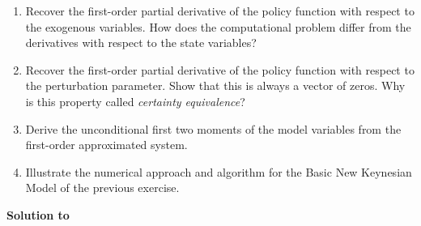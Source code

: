 \begin{enumerate}
	\item Recover the first-order partial derivative of the policy function with respect to the exogenous variables. How does the computational problem differ from the derivatives with respect to the state variables?
	\item Recover the first-order partial derivative of the policy function with respect to the perturbation parameter. Show that this is always a vector of zeros. Why is this property called \emph{certainty equivalence}?
	\item Derive the unconditional first two moments of the model variables from the first-order approximated system.
 	\item Illustrate the numerical approach and algorithm for the Basic New Keynesian Model of the previous exercise.
\end{enumerate}

\begin{solution}\textbf{Solution to }
\ifDisplaySolutions%

\fi
\newpage
\end{solution}